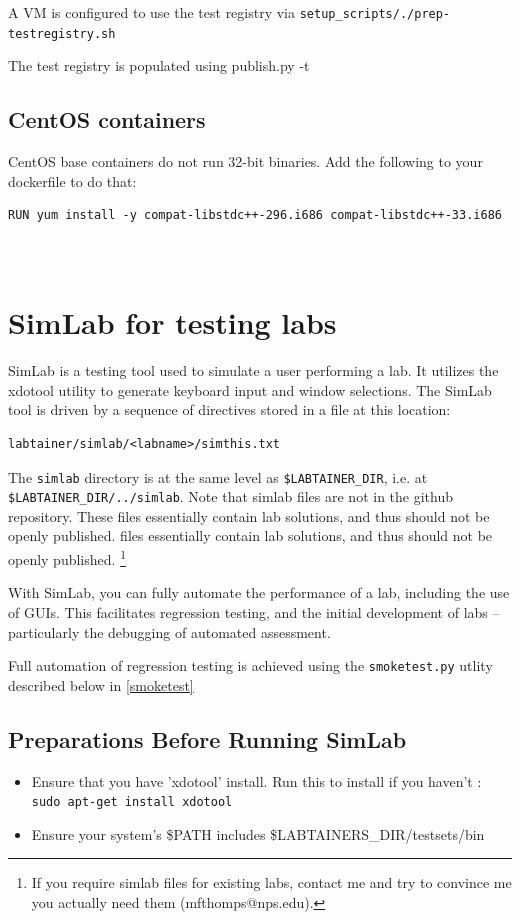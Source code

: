 \documentclass[12pt]{article}
\begin{document}
A VM is configured to use the test registry via {\tt setup\_scripts/./prep-testregistry.sh}

The test registry is populated using publish.py -t

\subsection {CentOS containers}
CentOS base containers do not run 32-bit binaries.  Add the following to your dockerfile to do that:
\begin{verbatim}
RUN yum install -y compat-libstdc++-296.i686 compat-libstdc++-33.i686
\end{verbatim}

\newpage
\appendix
\section{\\SimLab for testing labs}
\label{testing}
SimLab is a testing tool used to simulate a user performing a lab.  
It utilizes the xdotool utility to
generate keyboard input and window selections.  The SimLab tool is driven by a 
sequence of directives stored in a file at this location:
\begin{verbatim}
labtainer/simlab/<labname>/simthis.txt
\end{verbatim}
The {\tt simlab} directory is at the same level as {\tt \$LABTAINER\_DIR}, i.e. at {\tt \$LABTAINER\_DIR/../simlab}.
Note that simlab files are not in the github repository.  These
files essentially contain lab solutions, and thus should not be openly published.
files essentially contain lab solutions, and thus should not be openly published.
\footnote{If you require simlab files for existing labs, contact me and try to convince
me you actually need them (mfthomps@nps.edu).}

With SimLab, you can fully automate the performance of a lab, including the use of GUIs.
This facilitates regression testing, and the initial development of labs -- particularly
the debugging of automated assessment.   

Full automation of regression testing is achieved using the {\tt smoketest.py} utlity
described below in \ref{smoketest}

\subsection {Preparations Before Running SimLab}
\begin{itemize}
	\item Ensure that you have 'xdotool' install. Run this to install if you haven't : \\ 
		{\tt sudo apt-get install xdotool}

	\item Ensure your system's \$PATH includes \$LABTAINERS\_DIR/testsets/bin 

\end{itemize}
\end{document}
